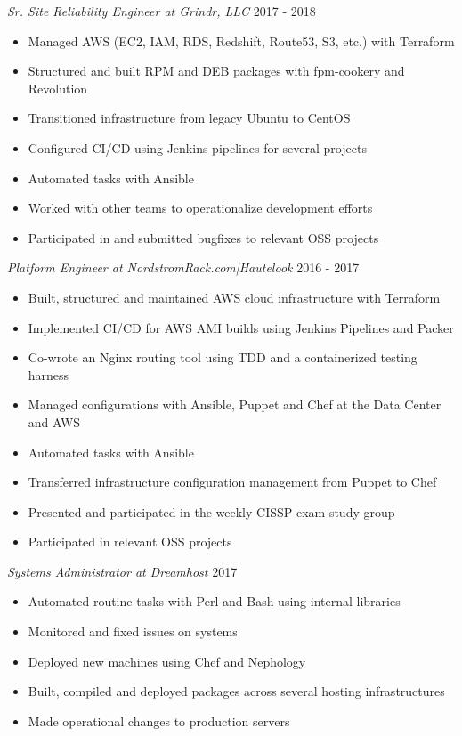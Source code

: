 \documentclass[line]{tex/res}
\begin{document}
\begin{resume}
    {\sl Sr. Site Reliability Engineer at Grindr, LLC} \hfill 2017 - 2018
    \begin{itemize} \itemsep -2pt %
        \item Managed AWS (EC2, IAM, RDS, Redshift, Route53, S3, etc.) with Terraform
        \item Structured and built RPM and DEB packages with fpm-cookery and Revolution
        \item Transitioned infrastructure from legacy Ubuntu to CentOS
        \item Configured CI/CD using Jenkins pipelines for several projects
        \item Automated tasks with Ansible
        \item Worked with other teams to operationalize development efforts
        \item Participated in and submitted bugfixes to relevant OSS projects
    \end{itemize}

    {\sl Platform Engineer at NordstromRack.com|Hautelook} \hfill 2016 - 2017
    \begin{itemize} \itemsep -2pt %
        \item Built, structured and maintained AWS cloud infrastructure with Terraform
        \item Implemented CI/CD for AWS AMI builds using Jenkins Pipelines and Packer
        \item Co-wrote an Nginx routing tool using TDD and a containerized testing harness
        \item Managed configurations with Ansible, Puppet and Chef at the Data Center and AWS
        \item Automated tasks with Ansible
        \item Transferred infrastructure configuration management from Puppet to Chef
        \item Presented and participated in the weekly CISSP exam study group
        \item Participated in relevant OSS projects
    \end{itemize}

    {\sl Systems Administrator at Dreamhost} \hfill 2017
    \begin{itemize} \itemsep -2pt
        \item Automated routine tasks with Perl and Bash using internal libraries
        \item Monitored and fixed issues on systems
        \item Deployed new machines using Chef and Nephology
        \item Built, compiled and deployed packages across several hosting infrastructures
        \item Made operational changes to production servers
    \end{itemize}


\end{resume}
\end{document}
